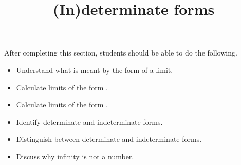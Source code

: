 \documentclass{ximera}
\title{(In)determinate forms}
\begin{document}
\begin{abstract}
\end{abstract}
\maketitle

\begin{sectionOutcomes}
After completing this section, students should be able to do the following.

\begin{itemize}
\item Understand what is meant by the form of a limit.
\item Calculate limits of the form \zeroOverZero.
\item Calculate limits of the form \numOverZero.
\item Identify determinate and indeterminate forms.
\item Distinguish between determinate and indeterminate forms.
\item Discuss why infinity is not a number.
\end{itemize}
\end{sectionOutcomes}
\end{document}
